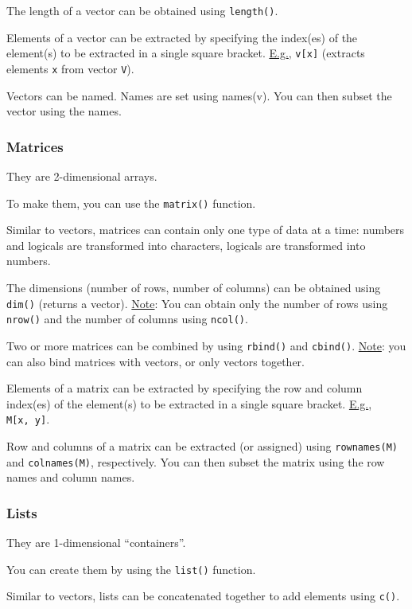 \documentclass[
]{article}
\begin{document}
The length of a vector can be obtained using \texttt{length()}.

Elements of a vector can be extracted by specifying the index(es) of the
element(s) to be extracted in a single square bracket. \underline{E.g.},
\texttt{v{[}x{]}} (extracts elements \texttt{x} from vector \texttt{V}).

Vectors can be named. Names are set using names(v). You can then subset
the vector using the names.

\hypertarget{matrices}{%
\subsubsection{Matrices}\label{matrices}}

They are 2-dimensional arrays.

To make them, you can use the \texttt{matrix()} function.

Similar to vectors, matrices can contain only one type of data at a
time: numbers and logicals are transformed into characters, logicals are
transformed into numbers.

The dimensions (number of rows, number of columns) can be obtained using
\texttt{dim()} (returns a vector). \underline{Note}: You can obtain only
the number of rows using \texttt{nrow()} and the number of columns using
\texttt{ncol()}.

Two or more matrices can be combined by using \texttt{rbind()} and
\texttt{cbind()}. \underline{Note}: you can also bind matrices with
vectors, or only vectors together.

Elements of a matrix can be extracted by specifying the row and column
index(es) of the element(s) to be extracted in a single square bracket.
\underline{E.g.}, \texttt{M{[}x,\ y{]}}.

Row and columns of a matrix can be extracted (or assigned) using
\texttt{rownames(M)} and \texttt{colnames(M)}, respectively. You can
then subset the matrix using the row names and column names.

\hypertarget{lists}{%
\subsubsection{Lists}\label{lists}}

They are 1-dimensional ``containers''.

You can create them by using the \texttt{list()} function.

Similar to vectors, lists can be concatenated together to add elements
using \texttt{c()}.
\end{document}
